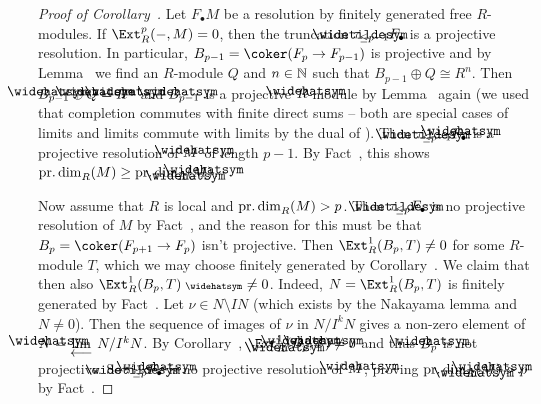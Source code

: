 \documentclass[a4paper,parskip=half,numbers=enddot, DIV=12]{scrreprt}
\begin{document}
\begin{proof}[Proof of Corollary~]
	Let $F_\bullet M$ be a resolution by finitely generated free $R$-modules. If $\Ext_R^p(-,M)=0$, then the truncation $\snake{\tau}_{\leq p-1}F_\bullet$ is a projective resolution. In particular, $B_{p-1}=\coker(F_p\morphism F_{p-1})$ is projective and by Lemma~ we find an $R$-module $Q$ and $n\in\mathbb{N}$ such that $B_{p-1}\oplus Q\cong R^n$. Then $\roof{B}_{p-1}\oplus\roof{Q}=\roof{R}^n$ and $\roof{B}_{p-1}$ is a projective $\roof{R}$-module by Lemma~ again (we used that completion commutes with finite direct sums -- both are special cases of limits and limits commute with limits by the dual of \cite[Corollary~A.1.1]{alggeo2}). Then $\snake{\tau}_{\leq p-1}\roof{F}_\bullet$ is a projective resolution of $\roof{M}$ of length $p-1$. By Fact~, this shows $\pdim_R(M)\geq\pdim_{\roof{R}}(\roof{M})$.
	
	Now assume that $R$ is local and $\operatorname{pr.dim}_R(M)>p$. Then $\snake{\tau}_{\leq p}F_\bullet$ is no projective resolution of $M$ by Fact~, and the reason for this must be that $B_p=\coker(F_{p+1}\morphism F_p)$ isn't projective. Then $\Ext_R^1(B_p,T)\neq 0$ for some $R$-module $T$, which we may choose finitely generated by Corollary~. We claim that then also $\Ext_R^1(B_p,T)^\complete \neq 0$. Indeed, $N=\Ext_R^1(B_p,T)$ is finitely generated by Fact~. Let $\nu\in N\setminus IN$ (which exists by the Nakayama lemma and $N\neq 0$). Then the sequence of images of $\nu$ in $N/I^kN$ gives a non-zero element of $\roof{N}=\limit N/I^kN$. By Corollary~, $\Ext_{\roof{R}}^1(\roof{B}_p,\roof{T})\neq 0$ and thus $\roof{B}_p$ is not projective. So $\snake{\tau}_{\leq p}\roof{F}_\bullet$ is no projective resolution of $\roof{M}$, proving $\pdim_{\roof{R}}(\roof{M})>p$ by Fact~.
\end{proof}
\end{document}
